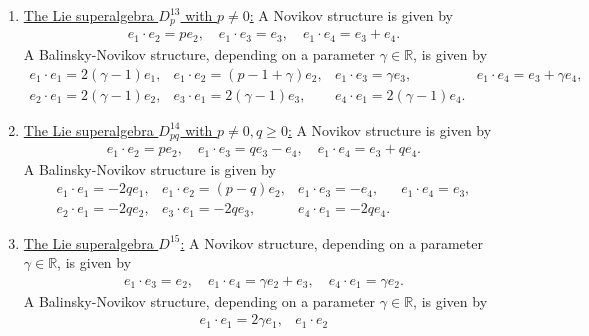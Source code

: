 \documentclass[12pt]{amsart}
\begin{document}
\begin{enumerate}
\[\begin{array}{l}
e_1\cdot e_2=e_2, \quad e_1\cdot e_4= (1+\gamma) e_3 , \quad e_4\cdot e_1= \gamma  e_3. 
\end{array}
 \]
A Balinsky-Novikov structure is given by
 \[
 \begin{array}{llll}
e_1 \cdot e_1=  -2e_1, & e_1 \cdot e_3
=- e_3, & 
e_1 \cdot e_4= e_3- e_4,& e_2\cdot e_1=-2e_2,\\[2mm]
e_3 \cdot e_1=-2 e_3, & e_4\cdot e_1=-2e_4.
 \end{array}
 \]
  \item \underline{The Lie superalgebra $D^{13}_p$ with  $p\not =0$:} A Novikov structure is given by
    \[
\begin{array}{l}
e_1\cdot e_2= p e_2 , \quad e_1\cdot e_3=  e_3, \quad e_1\cdot e_4=e_3+e_4. 
\end{array}
 \]
A Balinsky-Novikov structure, depending on a parameter  $\gamma \in \mathbb R$, is given by
 \[
 \begin{array}{llll}
e_1 \cdot e_1=  2(\gamma -1) e_1, & e_1 \cdot e_2
= (p-1+\gamma)e_2, & 
e_1 \cdot e_3= \gamma e_3,& e_1\cdot e_4=e_3+ \gamma e_4,\\[2mm]
e_2 \cdot e_1=2(\gamma-1) e_2, & e_3\cdot e_1=2 (\gamma -1) e_3,& e_4\cdot e_1=2(\gamma-1)e_4.
 \end{array}
 \]
  \item \underline{The Lie superalgebra $D^{14}_{pq}$ with $p\not =0, q\geq 0$:} A Novikov structure is given by 
    \[
\begin{array}{l}
e_1\cdot e_2= p e_2 , \quad e_1\cdot e_3=  qe_3-e_4, \quad e_1\cdot e_4=e_3+qe_4. 
\end{array}
 \]
A Balinsky-Novikov structure is given by
 \[
 \begin{array}{llll}
e_1 \cdot e_1=  -2 q e_1, & e_1 \cdot e_2
= (p-q)e_2, & 
e_1 \cdot e_3= - e_4,& e_1\cdot e_4=e_3,\\[2mm]
e_2 \cdot e_1=-2q e_2, & e_3\cdot e_1=- 2 q e_3,& e_4\cdot e_1=-2 q e_4.
 \end{array}
 \]
  \item \underline{The Lie superalgebra $D^{15}$:} A Novikov structure, depending on a parameter $\gamma \in \mathbb R$, is given by
    \[
\begin{array}{l}
e_1\cdot e_3=e_2, \quad e_1\cdot e_4= \gamma e_2 + e_3 , \quad e_4\cdot e_1= \gamma e_2.
\end{array}
 \]
A Balinsky-Novikov structure, depending on a parameter $\gamma \in \mathbb R$, is given by
 \[
 \begin{array}{llll}
e_1 \cdot e_1=  2 \gamma  e_1, & e_1 \cdot e_2

\end{array}\]
\end{enumerate}
\end{document}
